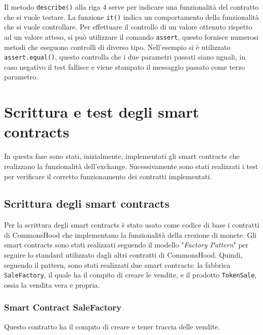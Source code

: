 \documentclass[a4paper]{article}
\begin{document}
        Il metodo \verb|describe()| alla riga 4 serve per indicare una funzionalità del contratto che si vuole testare.
        La funzione \verb|it()| indica un comportamento della funzionalità che si vuole controllare.
        \newline
        Per effettuare il controllo di un valore ottenuto rispetto ad un valore atteso, si può utilizzare il comando \verb|assert|, questo fornisce numerosi metodi che eseguono controlli di diverso tipo.
        Nell'esempio si è utilizzato \verb|assert.equal()|, questo controlla che i due parametri passati siano uguali, in caso negativo il test fallisce e viene stampato il messaggio passato come terzo parametro.
        \newpage

        \section{Scrittura e test degli smart contracts}
        In questa fase sono stati, inizialmente, implementati gli smart contracts che realizzano la funzionalità dell'exchange. Sucessivamente sono stati realizzati i test per verificare il corretto funzionamento dei contratti implementati.
        \subsection{Scrittura degli smart contracts}
        Per la scrittura degli smart contracts è stato usato come codice di base i contratti di CommonsHood che implementano la funzionalità della crezione di monete.
        Gli smart contracts sono stati realizzati seguendo il modello "\emph{Factory Pattern}" per seguire lo standard utilizzato dagli altri contratti di CommonsHood. Quindi, seguendo il pattern, sono stati realizzati
        due smart contracts: la fabbrica \verb|SaleFactory|, il quale ha il compito di creare le vendite, e il prodotto \verb|TokenSale|, ossia la vendita vera e propria.
        \subsubsection{Smart Contract SaleFactory}
        Questo contratto ha il compito di creare e tener traccia delle vendite.
\end{document}
